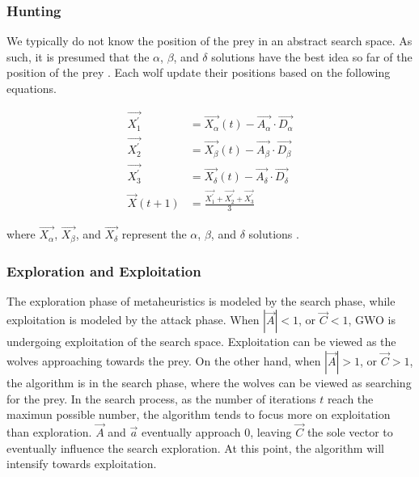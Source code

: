 \subsubsection{Hunting}
We typically do not know the position of the prey in an abstract search space. As such, it is presumed that the $\alpha$, $\beta$, and $\delta$ solutions have the best idea so far of the position of the prey \cite{Mirjalili20}. Each wolf update their positions based on the following equations.

\begin{align}
	\vec{X_{1}^{'}} &= \vec{X_{\alpha}}(t) - \vec{A_{\alpha}} \cdot \vec{D_{\alpha}} \\
	\vec{X_{2}^{'}} &= \vec{X_{\beta}}(t) - \vec{A_{\beta}} \cdot \vec{D_{\beta}} \\
	\vec{X_{3}^{'}} &= \vec{X_{\delta}}(t) - \vec{A_{\delta}} \cdot \vec{D_{\delta}} \\
	\vec{X}(t + 1)  &= \frac{\vec{X_{1}^{'}} + \vec{X_{2}^{'}} + \vec{X_{3}^{'}}}{3}
\end{align}

where $\vec{X_{\alpha}}$, $\vec{X_{\beta}}$, and $\vec{X_{\delta}}$ represent the $\alpha$, $\beta$, and $\delta$ solutions \cite{Gupta2018}.

\subsubsection{Exploration and Exploitation}
The exploration phase of metaheuristics is modeled by the search phase, while exploitation is modeled by the attack phase. When $\left| \vec{A} \right| < 1$, or $\vec{C} < 1$, GWO is undergoing exploitation of the search space. Exploitation can be viewed as the wolves approaching towards the prey. On the other hand, when $\left| \vec{A} \right| > 1$, or $\vec{C} > 1$, the algorithm is in the search phase, where the wolves can be viewed as searching for the prey. In the search process, as the number of iterations $t$ reach the maximun possible number, the algorithm tends to focus more on exploitation than exploration. $\vec{A}$ and $\vec{a}$ eventually approach $0$, leaving $\vec{C}$ the sole vector to eventually influence the search exploration. At this point, the algorithm will intensify towards exploitation. 